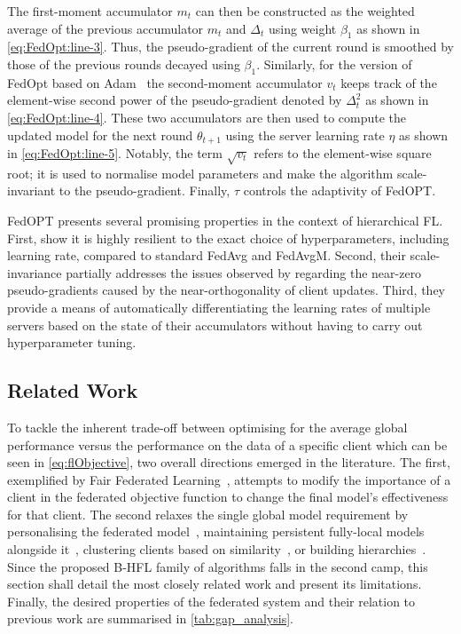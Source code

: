 The first-moment accumulator $m_t$ can then be constructed as the weighted average of the previous accumulator $m_t$ and $\Delta_t$ using weight $\beta_1$ as shown in \cref{eq:FedOpt:line-3}. Thus, the pseudo-gradient of the current round is smoothed by those of the previous rounds decayed using $\beta_1$. Similarly, for the version of FedOpt based on Adam~\citep{Adam} the second-moment accumulator $v_t$  keeps track of the element-wise second power of the pseudo-gradient denoted by $\Delta_t^2$ as shown in \cref{eq:FedOpt:line-4}. These two accumulators are then used to compute the updated model for the next round $\theta_{t+1}$ using the server learning rate $\eta$ as shown in \cref{eq:FedOpt:line-5}. Notably, the term $\sqrt{v_t}$ refers to the element-wise square root; it is used to normalise model parameters and make the algorithm scale-invariant to the pseudo-gradient. Finally, $\tau$ controls the adaptivity of FedOPT\@.

FedOPT presents several promising properties in the context of hierarchical FL\@. First, \citet{FedOPT} show it is highly resilient to the exact choice of hyperparameters, including learning rate, compared to standard FedAvg and FedAvgM. Second, their scale-invariance partially addresses the issues observed by \citet{LargeCohorts} regarding the near-zero pseudo-gradients caused by the near-orthogonality of client updates. Third, they provide a means of automatically differentiating the learning rates of multiple servers based on the state of their accumulators without having to carry out hyperparameter tuning.


\subsection{Related Work}

To tackle the inherent trade-off between optimising for the average global performance versus the performance on the data of a specific client which can be seen in \cref{eq:flObjective}, two overall directions emerged in the literature. The first, exemplified by Fair Federated Learning~\citep{QFedAvg}, attempts to modify the importance of a client in the federated objective function to change the final model's effectiveness for that client. The second relaxes the single global model requirement by personalising the federated model~\citep{SalvagingFL,TowardsPersonalisedFL,FLwithNonIID}, maintaining persistent fully-local models alongside it~\citep{Ditto}, clustering clients based on similarity~\citep{ThreeApproachesMansour,AnEfficientFrameworkForClusteredFL}, or building hierarchies~\citep{Client-Edge-CloudHierFL,Hier_Het_Cellular}. Since the proposed B-HFL family of algorithms falls in the second camp, this section shall detail the most closely related work and present its limitations. Finally, the desired properties of the federated system and their relation to previous work are summarised in \cref{tab:gap_analysis}.


